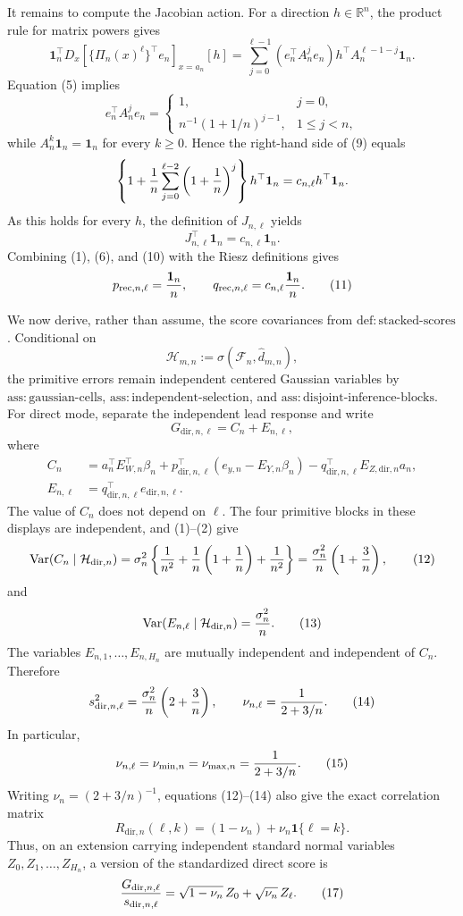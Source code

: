 It remains to compute the Jacobian action.  For a direction \(h\in\mathbb R^n\), the product rule for matrix powers gives
\[
 \boldsymbol 1_n^{\top}D_x[\{\Pi_n(x)^\ell\}^{\top}e_n]_{x=a_n}[h]
 =\sum_{j=0}^{\ell-1}(e_n^{\top}A_n^je_n)
      h^{\top}A_n^{\ell-1-j}\boldsymbol 1_n.
 \tag{9}
\]
Equation (5) implies
\[
 e_n^{\top}A_n^je_n=
 \begin{cases}
 1,&j=0,\\
 n^{-1}(1+1/n)^{j-1},&1\leq j<n,
 \end{cases}
\]
while \(A_n^k\boldsymbol 1_n=\boldsymbol 1_n\) for every \(k\geq0\).  Hence the right-hand side of (9) equals
\[
 \left\{1+{1\over n}\sum_{j=0}^{\ell-2}
          \left(1+{1\over n}\right)^j\right\}
 h^{\top}\boldsymbol 1_n
 =c_{n,\ell}h^{\top}\boldsymbol 1_n.
\]
As this holds for every \(h\), the definition of \(J_{n,\ell}\) yields
\[
 J_{n,\ell}^{\top}\boldsymbol 1_n
 =c_{n,\ell}\boldsymbol 1_n.
 \tag{10}
\]
Combining (1), (6), and (10) with the Riesz definitions gives
\[
 p_{\mathrm{rec},n,\ell}={\boldsymbol 1_n\over n},
 \qquad
 q_{\mathrm{rec},n,\ell}=c_{n,\ell}{\boldsymbol 1_n\over n}.
 \tag{11}
\]

We now derive, rather than assume, the score covariances from \(\mathrm{def{:}stacked\mbox{-}scores}\).  Conditional on
\[
 \mathcal H_{m,n}:=\sigma(\mathcal F_n,\widehat d_{m,n}),
\]
the primitive errors remain independent centered Gaussian variables by \(\mathrm{ass{:}gaussian\mbox{-}cells}\), \(\mathrm{ass{:}independent\mbox{-}selection}\), and \(\mathrm{ass{:}disjoint\mbox{-}inference\mbox{-}blocks}\).  For direct mode, separate the independent lead response and write
\[
 G_{\mathrm{dir},n,\ell}=C_n+E_{n,\ell},
\]
where
\[
\begin{aligned}
 C_n&=a_n^{\top}E_{W,n}^{\top}\beta_n
 +p_{\mathrm{dir},n,\ell}^{\top}(e_{y,n}-E_{Y,n}\beta_n)
 -q_{\mathrm{dir},n,\ell}^{\top}E_{Z,\mathrm{dir},n}a_n,\\
 E_{n,\ell}&=q_{\mathrm{dir},n,\ell}^{\top}e_{\mathrm{dir},n,\ell}.
\end{aligned}
\]
The value of \(C_n\) does not depend on \(\ell\).  The four primitive blocks in these displays are independent, and (1)--(2) give
\[
 \operatorname{Var}(C_n\mid\mathcal H_{\mathrm{dir},n})
 =\sigma_n^2\left\{{1\over n^2}
   +{1\over n}\left(1+{1\over n}\right)
   +{1\over n^2}\right\}
 ={\sigma_n^2\over n}\left(1+{3\over n}\right),
 \tag{12}
\]
and
\[
 \operatorname{Var}(E_{n,\ell}\mid\mathcal H_{\mathrm{dir},n})
 ={\sigma_n^2\over n}.
 \tag{13}
\]
The variables \(E_{n,1},\ldots,E_{n,H_n}\) are mutually independent and independent of \(C_n\).  Therefore
\[
 s_{\mathrm{dir},n,\ell}^2
 ={\sigma_n^2\over n}\left(2+{3\over n}\right),
 \qquad
 \nu_{n,\ell}={1\over 2+3/n}.
 \tag{14}
\]
In particular,
\[
 \nu_{n,\ell}=\nu_{\min,n}=\nu_{\max,n}={1\over2+3/n}.
 \tag{15}
\]
Writing \(\nu_n=(2+3/n)^{-1}\), equations (12)--(14) also give the exact correlation matrix
\[
 R_{\mathrm{dir},n}(\ell,k)
 =(1-\nu_n)+\nu_n\boldsymbol 1\{\ell=k\}.
 \tag{16}
\]
Thus, on an extension carrying independent standard normal variables \(Z_0,Z_1,\ldots,Z_{H_n}\), a version of the standardized direct score is
\[
 {G_{\mathrm{dir},n,\ell}\over s_{\mathrm{dir},n,\ell}}
 =\sqrt{1-\nu_n}\,Z_0+\sqrt{\nu_n}\,Z_\ell.
 \tag{17}
\]

